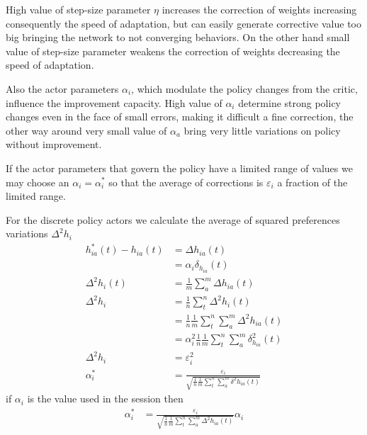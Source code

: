 \documentclass[]{article}
\begin{document}
High value of step-size parameter $ \eta $ increases the correction of weights increasing consequently the speed of adaptation, but can easily generate corrective value too big bringing the network to not converging behaviors.
On the other hand small value of step-size parameter weakens the correction of weights decreasing the speed of adaptation.

Also the actor parameters $ \alpha_i $, which modulate the policy changes from the critic, influence the improvement capacity.
High value of $ \alpha_i $ determine strong policy changes even in the face of small errors, making it difficult a fine correction, the other way around very small value of $ \alpha_a $ bring very little variations on policy without improvement.

If the actor parameters that govern the policy have a limited range of values we may choose an $ \alpha_i = \alpha^*_i $ so that the average of corrections is $ \varepsilon_i $ a fraction of the limited range.

For the discrete policy actors we calculate the average of squared preferences variations $ \Delta^2h_{i} $
\begin{align*}
	h^*_{ia}(t) - h_{ia}(t)&=	\Delta h_{ia}(t)
	\\
	&=	\alpha_i \delta_{h_{ia}}(t)
	\\
	\Delta^2h_{i}(t)&=			\frac{1}{m} \sum_a^m \Delta h_{ia}(t)
	\\
	\Delta^2h_{i}&=			\frac{1}{n} \sum_t^n \Delta^2 h_{i}(t)
	\\
	&=			\frac{1}{n}\frac{1}{m}\sum_t^n \sum_a^m \Delta^2 h_{ia}(t)
	\\
	&=	\alpha^2_i\frac{1}{n}\frac{1}{m}\sum_t^n \sum_a^m  \delta^2_{h_{ia}}(t)
	\\
	\Delta^2h_i &=	\varepsilon^2_i
	\\
	\alpha^*_i&=	\frac{\varepsilon_i}{\sqrt{\frac{1}{n} \frac{1}{m}\sum_t^n \sum_a^m \delta^2 h_{ia}(t)}}
\end{align*}
if $ \alpha_i $ is the value used in the session then
\begin{align}
	\alpha^*_i&=	\frac{\varepsilon_i}{\sqrt{\frac{1}{n} \frac{1}{m} \sum_t^n \sum_a^m \Delta^2 h_{ia}(t)}} \alpha_i
\end{align}
\end{document}
